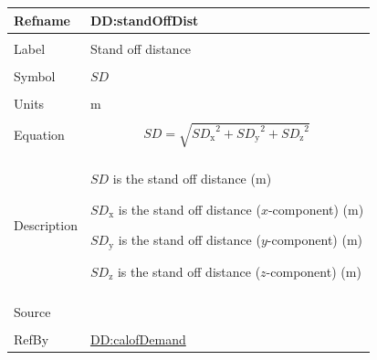 \documentclass[12pt]{article}
\begin{document}
\vspace{\baselineskip}
\noindent
\begin{minipage}{\textwidth}
\begin{tabular}{>{\raggedright}p{}>{\raggedright\arraybackslash}p{}}
\toprule \textbf{Refname} & \textbf{DD:standOffDist}
\label{DD:standOffDist}
\\ \midrule \\
Label & Stand off distance
        
\\ \midrule \\
Symbol & $\mathit{SD}$
         
\\ \midrule \\
Units & ${\text{m}}$
        
\\ \midrule \\
Equation & \begin{displaymath}
           \mathit{SD}=\sqrt{{\mathit{SD}_{\text{x}}}^{2}+{\mathit{SD}_{\text{y}}}^{2}+{\mathit{SD}_{\text{z}}}^{2}}
           \end{displaymath}
\\ \midrule \\
Description & \begin{symbDescription}
              \item{$\mathit{SD}$ is the stand off distance (${\text{m}}$)}
              \item{${\mathit{SD}_{\text{x}}}$ is the stand off distance ($x$-component) (${\text{m}}$)}
              \item{${\mathit{SD}_{\text{y}}}$ is the stand off distance ($y$-component) (${\text{m}}$)}
              \item{${\mathit{SD}_{\text{z}}}$ is the stand off distance ($z$-component) (${\text{m}}$)}
              \end{symbDescription}
\\ \midrule \\
Source & \cite{astm2009}
         
\\ \midrule \\
RefBy & \hyperref[DD:calofDemand]{DD:calofDemand}
        
\\ \bottomrule
\end{tabular}
\end{minipage}
\end{document}
